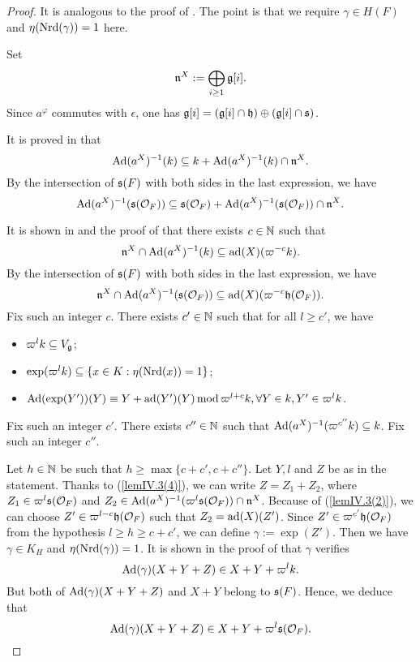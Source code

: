 \documentclass[a4paper]{amsart}
\theoremstyle{definition}
\theoremstyle{remark}
\numberwithin{equation}{subsection}
\begin{document}
\begin{proof}
It is analogous to the proof of \cite[Lemme IV.3]{MR1344131}. The point is that we require $\gamma\in H(F)$ and $\eta({\mathrm{Nrd}}(\gamma))=1$ here. 

Set
$$ {\mathfrak{n}}^X:=\bigoplus_{i\geq1} {\mathfrak{g}}[i]. $$
Since $a^\varphi$ commutes with $\epsilon$, one has ${\mathfrak{g}}[i]=({\mathfrak{g}}[i]\cap{\mathfrak{h}})\oplus({\mathfrak{g}}[i]\cap{\mathfrak{s}})$. 

It is proved in \cite[(4) in \S IV.3]{MR1344131} that 
$$ {\mathrm{Ad}}(a^X)^{-1}(k)\subseteq k+{\mathrm{Ad}}(a^X)^{-1}(k)\cap{\mathfrak{n}}^X.  $$
By the intersection of ${\mathfrak{s}}(F)$ with both sides in the last expression, we have
\begin{equation}\label{lemIV.3(4)}
 {\mathrm{Ad}}(a^X)^{-1}({\mathfrak{s}}({\mathcal {O}}_F))\subseteq {\mathfrak{s}}({\mathcal {O}}_F)+{\mathrm{Ad}}(a^X)^{-1}({\mathfrak{s}}({\mathcal {O}}_F))\cap{\mathfrak{n}}^X. 
\end{equation}

It is shown in \cite[(2) in \S IV.3]{MR1344131} and the proof of \cite[Lemme IV.3]{MR1344131} that there exists $c\in{\mathbb {N}}$ such that 
$$ {\mathfrak{n}}^X\cap{\mathrm{Ad}}(a^X)^{-1}(k)\subseteq {\mathrm{ad}}(X)(\varpi^{-c}k).  $$
By the intersection of ${\mathfrak{s}}(F)$ with both sides in the last expression, we have 
\begin{equation}\label{lemIV.3(2)}
 {\mathfrak{n}}^X\cap{\mathrm{Ad}}(a^X)^{-1}({\mathfrak{s}}({\mathcal {O}}_F))\subseteq {\mathrm{ad}}(X)(\varpi^{-c}{\mathfrak{h}}({\mathcal {O}}_F)). 
\end{equation}
Fix such an integer $c$. 
There exists $c'\in{\mathbb {N}}$ such that for all $l\geq c'$, we have 
\begin{itemize}
	\item $\varpi^l k\subseteq V_{\mathfrak{g}}$; 
	\item $\exp(\varpi^l k)\subseteq \{x\in K: \eta({\mathrm{Nrd}}(x))=1\}$; 
	\item ${\mathrm{Ad}}(\exp(Y'))(Y)\equiv Y+{\mathrm{ad}}(Y')(Y) \, \mathrm{mod}\, \varpi^{l+c}k, \forall Y\in k, Y'\in\varpi^l k$. 
\end{itemize}
Fix such an integer $c'$. 
There exists $c''\in{\mathbb {N}}$ such that ${\mathrm{Ad}}(a^X)^{-1}(\varpi^{c''}k)\subseteq k$. Fix such an integer $c''$. 

Let $h\in{\mathbb {N}}$ be such that $h\geq\max\{c+c', c+c''\}$. Let $Y,l$ and $Z$ be as in the statement. Thanks to (\ref{lemIV.3(4)}), we can write $Z=Z_1+Z_2$, where $Z_1\in\varpi^l{\mathfrak{s}}({\mathcal {O}}_F)$ and $Z_2\in{\mathrm{Ad}}(a^X)^{-1}(\varpi^l{\mathfrak{s}}({\mathcal {O}}_F))\cap{\mathfrak{n}}^X$. Because of (\ref{lemIV.3(2)}), we can choose $Z'\in\varpi^{l-c}{\mathfrak{h}}({\mathcal {O}}_F)$ such that $Z_2={\mathrm{ad}}(X)(Z')$. Since $Z'\in\varpi^{c'}{\mathfrak{h}}({\mathcal {O}}_F)$ from the hypothesis $l\geq h\geq c+c'$, we can define $\gamma:=\exp(Z')$. Then we have $\gamma\in K_H$ and $\eta({\mathrm{Nrd}}(\gamma))=1$. 
It is shown in the proof of \cite[Lemme IV.3]{MR1344131} that $\gamma$ verifies 
$$ {\mathrm{Ad}}(\gamma)(X+Y+Z)\in X+Y+\varpi^l k. $$
But both of ${\mathrm{Ad}}(\gamma)(X+Y+Z)$ and $X+Y$ belong to ${\mathfrak{s}}(F)$. Hence, we deduce that 
$$ {\mathrm{Ad}}(\gamma)(X+Y+Z)\in X+Y+\varpi^l {\mathfrak{s}}({\mathcal {O}}_F). $$
\end{proof}
\end{document}
